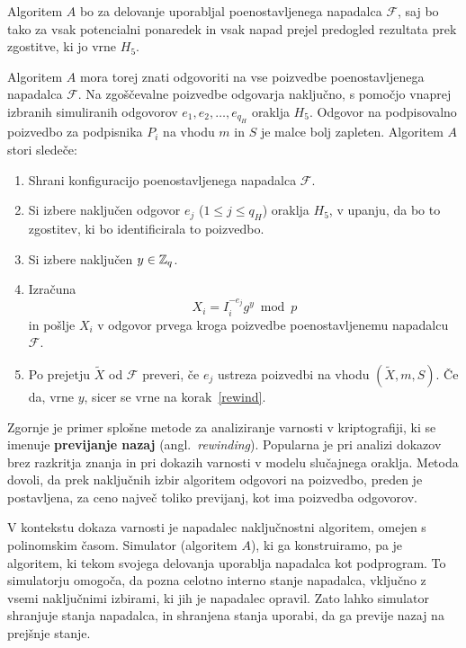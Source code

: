 \begin{dokaz}
Algoritem $A$ bo za delovanje uporabljal poenostavljenega napadalca $\mathcal{F}$, saj bo tako za
vsak potencialni ponaredek in vsak napad prejel predogled rezultata prek zgostitve, ki jo vrne $H_5$.

Algoritem $A$ mora torej znati odgovoriti na vse poizvedbe poenostavljenega napadalca $\mathcal{F}$.
Na zgoščevalne poizvedbe odgovarja naključno, s pomočjo vnaprej izbranih simuliranih odgovorov $e_1,
e_2, \dots, e_{q_H}$ oraklja $H_5$. Odgovor na podpisovalno poizvedbo za podpisnika $P_i$ na vhodu
$m$ in $S$ je malce bolj zapleten. Algoritem $A$ stori sledeče:
\begin{enumerate}
    \item Shrani konfiguracijo poenostavljenega napadalca $\mathcal{F}$.
    \item \label{rewind} Si izbere naključen odgovor $e_j$ ($1 \le j \le q_H$) oraklja $H_5$, 
        v upanju, da bo to zgostitev, ki bo identificirala to poizvedbo.
    \item Si izbere naključen $y \in \mathbb Z_q$.
    \item Izračuna 
        $$
        X_i = I_i^{-e_j}g^y \bmod p
        $$
        in pošlje $X_i$ v odgovor prvega kroga poizvedbe poenostavljenemu napadalcu $\mathcal{F}$.
    \item Po prejetju $\tilde{X}$ od $\mathcal{F}$ preveri, če $e_j$ ustreza poizvedbi na vhodu
        $(\tilde{X}, m, S)$. Če da, vrne $y$, sicer se vrne na korak~\ref{rewind}.
\end{enumerate}
Zgornje je primer splošne metode za analiziranje varnosti v kriptografiji, ki se imenuje 
\textbf{previjanje nazaj} (angl.\ \textit{rewinding}). Popularna je pri analizi dokazov brez razkritja
znanja in pri dokazih varnosti v modelu slučajnega oraklja. Metoda dovoli, da prek naključnih izbir
algoritem odgovori na poizvedbo, preden je postavljena, za ceno največ toliko previjanj, kot ima
poizvedba odgovorov.

\begin{opomba}
    V kontekstu dokaza varnosti je napadalec naključnostni algoritem, omejen s polinomskim časom.
    Simulator (algoritem $A$), ki ga konstruiramo, pa je algoritem, ki tekom svojega delovanja
    uporablja napadalca kot podprogram. To simulatorju omogoča, da pozna celotno interno stanje
    napadalca, vključno z vsemi naključnimi izbirami, ki jih je napadalec opravil. Zato lahko
    simulator shranjuje stanja napadalca, in shranjena stanja uporabi, da ga previje nazaj na
    prejšnje stanje.
\end{opomba}


\end{dokaz}
